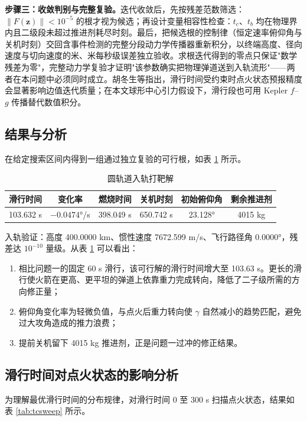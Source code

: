 \documentclass[withoutpreface,bwprint]{cumcmthesis}
\begin{document}
\textbf{步骤三：收敛判别与完整复验。}迭代收敛后，先按残差范数筛选：$\|F(\bm z)\|<10^{-5}$ 的根才视为候选；再设计变量相容性检查：$t_c$、$t_b$ 均在物理界内且二级段未超过推进剂耗尽时刻。最后，把候选根的控制律（恒定速率俯仰角与关机时刻）交回含事件检测的完整分段动力学传播器重新积分，以终端高度、径向速度与切向速度的米、米每秒级误差独立验收。求根迭代得到的零点只保证"数学残差为零"，完整动力学复验才证明"该参数确实把物理弹道送到入轨流形"——两者在本问题中必须同时成立。胡冬生等指出，滑行时间受约束时点火状态预报精度会显著影响边值迭代质量\cite{hu2023}；在本文球形中心引力假设下，滑行段也可用 Kepler $f$--$g$ 传播替代数值积分。

\subsection{结果与分析}
在给定搜索区间内得到一组通过独立复验的可行根，如表 \ref{tab:q2res} 所示。

\begin{table}[!htbp]
\caption{圆轨道入轨打靶解}
\label{tab:q2res}
\centering
\begin{tabular}{c|c|c|c|c|c}
\toprule[1.5pt]
滑行时间 & 变化率 & 燃烧时间 & 关机时刻 & 初始俯仰角 & 剩余推进剂 \\
\midrule[1pt]
103.632 s & $-0.0474$°/s & 398.049 s & 650.742 s & 23.128° & 4015 kg \\
\bottomrule[1.5pt]
\end{tabular}
\end{table}

入轨验证：高度 400.0000 km、惯性速度 7672.599 m/s、飞行路径角 0.0000°，残差达 $10^{-10}$ 量级。从表 \ref{tab:q2res} 可以看出：
\begin{enumerate}
    \item 相比问题一的固定 60 s 滑行，该可行解的滑行时间增大至 103.63 s。更长的滑行使火箭在更高、更平坦的弹道上依靠重力完成转向，降低了二子级所需的方向修正量；
    \item 俯仰角变化率为轻微负值，与点火后重力转向使 $\gamma$ 自然减小的趋势匹配，避免过大攻角造成的推力浪费；
    \item 提前关机留下 4015 kg 推进剂，正是问题一过冲的修正结果。
\end{enumerate}

\subsection{滑行时间对点火状态的影响分析}
为理解最优滑行时间的分布规律，对滑行时间 0 至 300 s 扫描点火状态，结果如表 \ref{tab:tcsweep} 所示。
\end{document}
